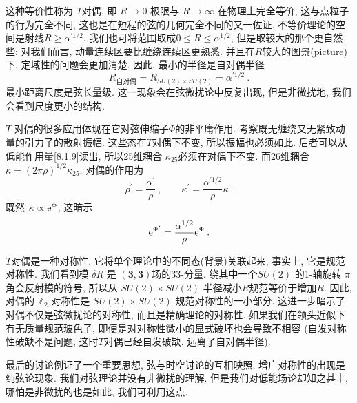这种等价性称为 $T$对偶. 即 $R \rightarrow 0$ 极限与 $R \rightarrow \infty$ 在物理上完全等价, 这与点粒子的行为完全不同, 
这也是在短程的弦的几何完全不同的又一佐证. 不等价理论的空间是射线$R \geq \alpha^{\prime 1 / 2} $. 
我们也可将范围取成$0 \leq R \leq \alpha^{1 / 2}$, 但是取较大的那个更自然些: 对我们而言, 动量连续区要比缠绕连续区更熟悉. 
并且在$R$较大的图景(picture)下, 定域性的问题会更加清楚. 因此, 最小的半径是自对偶半径
\begin{equation}
	R_{\text{自对偶}}=R_{SU(2) \times SU(2)}=\alpha^{\prime 1/2} \:. \label{8.3.29}
\end{equation}
最小距离尺度是弦长量级. 这一现象会在弦微扰论中反复出现, 但是非微扰地, 我们会看到尺度更小的结构. 

$T$ 对偶的很多应用体现在它对弦伸缩子$\Phi$的非平庸作用. 考察既无缠绕又无紧致动量的引力子的散射振幅. 这些态在$T$对偶下不变, 所以振幅也必须如此. 
后者可以从低能作用量\eqref{8.1.9}读出, 所以25维耦合 $\kappa_{25}$必须在对偶下不变. 而26维耦合 $\kappa=(2 \pi \rho)^{1 / 2} \kappa_{25}$, 
对偶的作用为
\begin{equation}
	\rho^{\prime}=\frac{\alpha^{\prime}}{\rho}\:, \qquad \kappa^{\prime}=\frac{\alpha^{\prime 1 / 2}}{\rho} \kappa \:. \label{8.3.30}
\end{equation}
既然 $\kappa \propto \mathrm{e}^{\Phi}$, 这暗示
\begin{equation}
	\mathrm{e}^{\Phi^{\prime}}=\frac{\alpha^{1 / 2}}{\rho} \mathrm{e}^{\Phi} \:. \label{8.3.31}
\end{equation}

$T$对偶是一种对称性, 它将单个理论中的不同态(背景)关联起来, 事实上, 它是规范对称性. 我们看到模 $\delta R$ 是 $(\bm{3},\bm{3})$场的33-分量. 
绕其中一个$S U(2)$ 的1-轴旋转 $\pi$角会反射模的符号, 所以从 $S U(2) \times S U(2)$ 半径减小$R$规范等价于增加$R$. 
因此, 对偶的 $\mathds{Z}_{2}$ 对称性是  $S U(2) \times S U(2)$ 规范对称性的一小部分. 这进一步暗示了对偶不仅是弦微扰论的对称性, 而且是精确理论的对称性. 
如果我们在领头近似下有无质量规范玻色子, 即便是对对称性微小的显式破坏也会导致不相容 (自发对称性破缺不是问题, 这时$T$对偶已经自发破缺, 远离了自对偶半径).

最后的讨论例证了一个重要思想, 弦与时空讨论的互相映照. 增广对称性的出现是纯弦论现象. 我们对弦理论并没有非微扰的理解. 
但是我们对低能场论却知之甚丰, 哪怕是非微扰的也是如此, 我们可利用这点.

